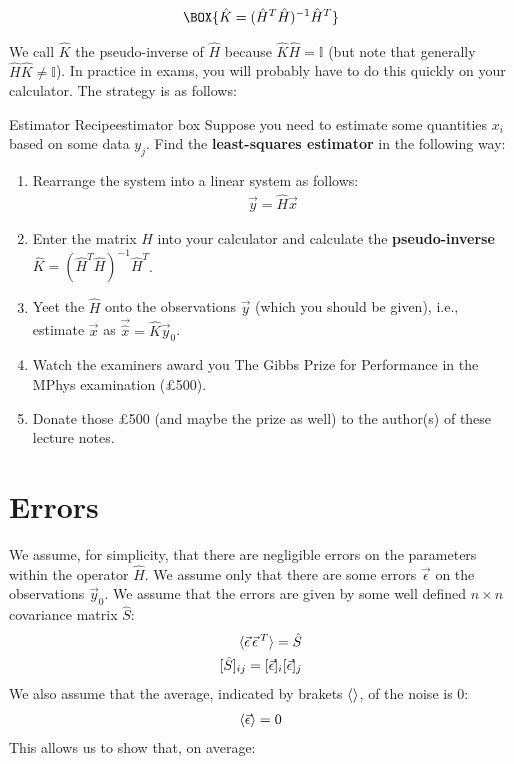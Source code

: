 \begin{align}
    \BOX{\hat{K}= (\hat{H}^T\hat{H})^{-1}\hat{H}^T}
\end{align}

We call $\hat{K}$ the pseudo-inverse of $\hat{H}$ because $\hat{K}\hat{H}=\mathbb{I}$ (but note that generally $\hat{H}\hat{K}\neq\mathbb{I}$). In practice in exams, you will probably have to do this quickly on your calculator. The strategy is as follows: 

\begin{fact}{Estimator Recipe}{estimator box}\label{estimator box}
    Suppose you need to estimate some quantities $x_i$ based on some data $y_j$. Find the \textbf{least-squares estimator} in the following way:
    \begin{enumerate}
        \item Rearrange the system into a linear system as follows:
    \begin{align*}
        \vec{y}=\hat{H}\vec{x}
    \end{align*}
        \item Enter the matrix $\hat{H}$ into your calculator and calculate the \textbf{pseudo-inverse} $\hat{K}= (\hat{H}^T\hat{H})^{-1}\hat{H}^T$. 
        \item Yeet the $\hat{H}$ onto the observations $\vec{y}$ (which you should be given), i.e., estimate $\vec{x}$ as $\vec{\hat{x}}=\hat{K}\vec{y}_0$.
        \item Watch the examiners award you The Gibbs Prize for Performance in the MPhys examination (£500).
        \item Donate those £500 (and maybe the prize as well) to the author(s) of these lecture notes.
    \end{enumerate}
\end{fact}

\section{Errors}

We assume, for simplicity, that there are negligible errors on the parameters within the operator $\hat{H}$. We assume only that there are some errors $\vec{\epsilon}$ on the observations $\vec{y}_0$. We assume that the errors are given by some well defined $n\times n$ covariance matrix $\hat{S}$:
\begin{align*}
    \braket{\vec{\epsilon}\,\vec{\epsilon}\,^T}=\hat{S}\\
    [\hat{S}]_{ij}=[\vec{\epsilon}]_i[\vec{\epsilon}]_j
\end{align*}
We also assume that the average, indicated by brakets $\braket{}$, of the noise is $0$:
\begin{align*}
    \braket{\vec{\epsilon}}=0
\end{align*}
This allows us to show that, on average:

